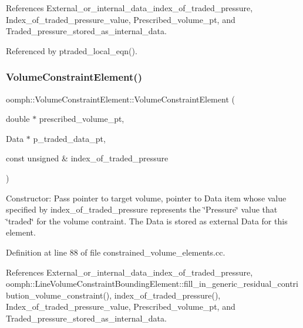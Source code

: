 References External\+\_\+or\+\_\+internal\+\_\+data\+\_\+index\+\_\+of\+\_\+traded\+\_\+pressure, Index\+\_\+of\+\_\+traded\+\_\+pressure\+\_\+value, Prescribed\+\_\+volume\+\_\+pt, and Traded\+\_\+pressure\+\_\+stored\+\_\+as\+\_\+internal\+\_\+data.



Referenced by ptraded\+\_\+local\+\_\+eqn().

\mbox{\label{classoomph_1_1VolumeConstraintElement_adc0fc16f4fc708fb09d70cb791a6c6b9}} 
\subsubsection{\texorpdfstring{Volume\+Constraint\+Element()}{VolumeConstraintElement()}\hspace{0.1cm}{\footnotesize\ttfamily [2/2]}}
{\footnotesize\ttfamily oomph\+::\+Volume\+Constraint\+Element\+::\+Volume\+Constraint\+Element (\begin{DoxyParamCaption}\item[{double $\ast$}]{prescribed\+\_\+volume\+\_\+pt,  }\item[{Data $\ast$}]{p\+\_\+traded\+\_\+data\+\_\+pt,  }\item[{const unsigned \&}]{index\+\_\+of\+\_\+traded\+\_\+pressure }\end{DoxyParamCaption})}



Constructor\+: Pass pointer to target volume, pointer to Data item whose value specified by index\+\_\+of\+\_\+traded\+\_\+pressure represents the \char`\"{}\+Pressure\char`\"{} value that \char`\"{}traded\char`\"{} for the volume contraint. The Data is stored as external Data for this element. 



Definition at line 88 of file constrained\+\_\+volume\+\_\+elements.\+cc.



References External\+\_\+or\+\_\+internal\+\_\+data\+\_\+index\+\_\+of\+\_\+traded\+\_\+pressure, oomph\+::\+Line\+Volume\+Constraint\+Bounding\+Element\+::fill\+\_\+in\+\_\+generic\+\_\+residual\+\_\+contribution\+\_\+volume\+\_\+constraint(), index\+\_\+of\+\_\+traded\+\_\+pressure(), Index\+\_\+of\+\_\+traded\+\_\+pressure\+\_\+value, Prescribed\+\_\+volume\+\_\+pt, and Traded\+\_\+pressure\+\_\+stored\+\_\+as\+\_\+internal\+\_\+data.

